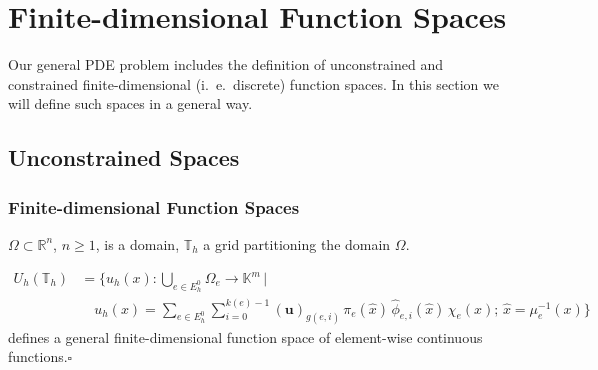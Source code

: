 \section{Finite-dimensional Function Spaces}\label{Sec:General}

Our general PDE problem includes the definition of unconstrained and
constrained finite-dimensional (i.~e.~discrete) function spaces. In
this section we will define such spaces in a general way. 

\subsection{Unconstrained Spaces}

\begin{frame}
\frametitle<presentation>{Finite-dimensional Function Spaces}
$\Omega\subset\mathbb{R}^n$, $n\geq 1$, is a domain, 
$\mathbb{T}_h$ a grid partitioning the domain $\Omega$.

\begin{Def}\label{Def:Vh}
\begin{equation*}\label{Eq:GenericFESpace}
\begin{split}
U_h(\mathbb{T}_h) &= \Biggl\{ u_h(x) : \bigcup_{e\in E_h^0}\Omega_e
 \to \mathbb{K}^m\,\Bigg| \\
&\quad u_h(x) = \sum_{e\in E_h^0}\sum_{i=0}^{k(e)-1} (\mathbf{u})_{g(e,i)}
\, \pi_e(\hat{x}) \, \hat\phi_{e,i}(\hat{x}) \, \chi_e(x); \, \hat{x}=\mu_e^{-1}(x) 
 \Biggr\}
\end{split}
\end{equation*}
defines a general finite-dimensional function space of element-wise
continuous functions.\hfill$\square$ 
\end{Def}
\end{frame}

